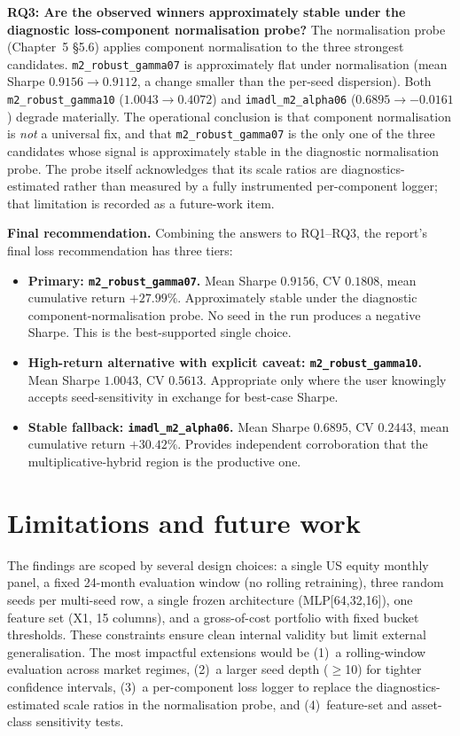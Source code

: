 \textbf{RQ3: Are the observed winners approximately stable under the diagnostic loss-component normalisation probe?} The normalisation probe (Chapter~5 \S5.6) applies component normalisation to the three strongest candidates. \texttt{m2\_robust\_gamma07} is approximately flat under normalisation (mean Sharpe $0.9156 \to 0.9112$, a change smaller than the per-seed dispersion). Both \texttt{m2\_robust\_gamma10} ($1.0043 \to 0.4072$) and \texttt{imadl\_m2\_alpha06} ($0.6895 \to -0.0161$) degrade materially. The operational conclusion is that component normalisation is \emph{not} a universal fix, and that \texttt{m2\_robust\_gamma07} is the only one of the three candidates whose signal is approximately stable in the diagnostic normalisation probe. The probe itself acknowledges that its scale ratios are diagnostics-estimated rather than measured by a fully instrumented per-component logger; that limitation is recorded as a future-work item.

\textbf{Final recommendation.} Combining the answers to RQ1--RQ3, the report's final loss recommendation has three tiers:

\begin{itemize}
 \item \textbf{Primary: \texttt{m2\_robust\_gamma07}.} Mean Sharpe $0.9156$, CV $0.1808$, mean cumulative return $+27.99\%$. Approximately stable under the diagnostic component-normalisation probe. No seed in the run produces a negative Sharpe. This is the best-supported single choice.
 \item \textbf{High-return alternative with explicit caveat: \texttt{m2\_robust\_gamma10}.} Mean Sharpe $1.0043$, CV $0.5613$. Appropriate only where the user knowingly accepts seed-sensitivity in exchange for best-case Sharpe.
 \item \textbf{Stable fallback: \texttt{imadl\_m2\_alpha06}.} Mean Sharpe $0.6895$, CV $0.2443$, mean cumulative return $+30.42\%$. Provides independent corroboration that the multiplicative-hybrid region is the productive one.
\end{itemize}

\section{Limitations and future work}

\label{sec:limitations}

The findings are scoped by several design choices: a single US equity monthly panel, a fixed 24-month evaluation window (no rolling retraining), three random seeds per multi-seed row, a single frozen architecture (MLP[64,32,16]), one feature set (X1, 15 columns), and a gross-of-cost portfolio with fixed bucket thresholds. These constraints ensure clean internal validity but limit external generalisation. The most impactful extensions would be (1)~a rolling-window evaluation across market regimes, (2)~a larger seed depth ($\geq$10) for tighter confidence intervals, (3)~a per-component loss logger to replace the diagnostics-estimated scale ratios in the normalisation probe, and (4)~feature-set and asset-class sensitivity tests.


